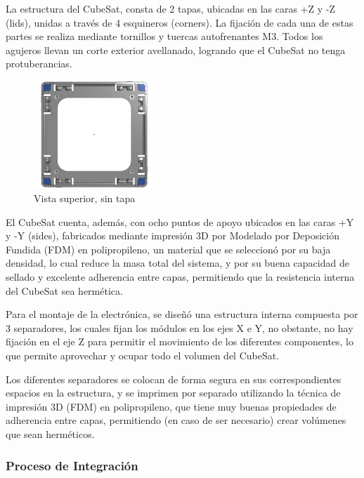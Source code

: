       La estructura del CubeSat, consta de 2 tapas, ubicadas en las caras +Z y -Z (lids), unidas a través
      de 4 esquineros (corners). La fijación de cada una de estas partes se realiza mediante tornillos y
      tuercas autofrenantes M3. Todos los agujeros llevan un corte exterior avellanado, logrando que el
      CubeSat no tenga protuberancias.

      \begin{figure}
        \centering
        \includegraphics[width=0.4\textwidth]{image/structure/superior.png}
        \caption{Vista superior, sin tapa}
        \label{fig:superior}
      \end{figure}
      El CubeSat cuenta, además, con ocho puntos de apoyo ubicados en las caras +Y y -Y (sides),
      fabricados mediante impresión 3D por Modelado por Deposición Fundida (FDM) en polipropileno, un
      material que se seleccionó por su baja densidad, lo cual reduce la masa total del sistema, y por
      su buena capacidad de sellado y excelente adherencia entre capas, permitiendo que la resistencia
      interna del CubeSat sea hermética.

      Para el montaje de la electrónica, se diseñó una estructura interna compuesta por 3 separadores,
      los cuales fijan los módulos en los ejes X e Y, no obstante, no hay fijación en el eje Z para
      permitir el movimiento de los diferentes componentes, lo que permite aprovechar y ocupar todo el
      volumen del CubeSat.

      Los diferentes separadores se colocan de forma segura en sus correspondientes espacios en la
      estructura, y se imprimen por separado utilizando la técnica de impresión 3D (FDM) en polipropileno,
      que tiene muy buenas propiedades de adherencia entre capas, permitiendo (en caso de ser necesario)
      crear volúmenes que sean herméticos.
    \subsubsection{Proceso de Integración}

